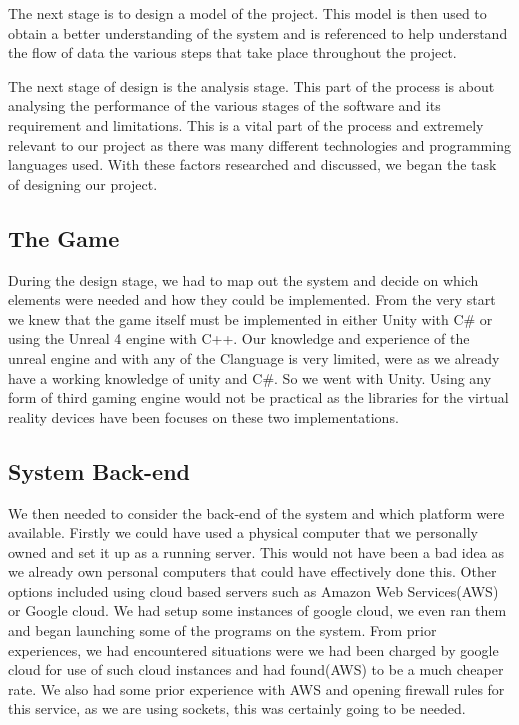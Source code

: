 The next stage is to design a model of the project. This model is then used to obtain a better understanding of the system and is referenced to help understand the flow of data the various steps that take place throughout the project. 

The next stage of design is the analysis stage. This part of the process is about analysing the performance of the various stages of the software and its requirement and limitations. This is a vital part of the process and extremely relevant to our project as there was many different technologies and programming languages used. With these factors researched and discussed, we began the task of designing our project.

\subsection {The Game}
During the design stage, we had to map out the system and decide on which elements were needed and how they could be implemented. From the very start we knew that the game itself must be implemented in either Unity with C\# or using the Unreal 4 engine with C++. Our knowledge and experience of the unreal engine and with any of the C\p\p language is very limited, were as we already have a working knowledge of unity and C\#. So we went with Unity. Using any form of third gaming engine would not be practical as the libraries for the virtual reality devices have been focuses on these two implementations.\newline

\subsection {System Back-end}
We then needed to consider the back-end of the system and which platform were available. Firstly we could have used a physical computer that we personally owned and set it up as a running server. This would not have been a bad idea as we already own personal computers that could have effectively done this. Other options included using cloud based servers such as Amazon Web Services(AWS) or Google cloud. We had setup some instances of google cloud, we even ran them and began launching some of the programs on the system. From prior experiences, we had encountered situations were we had been charged by google cloud for use of such cloud instances and had found(AWS) to be a much cheaper rate. We also had some prior experience with AWS and opening firewall rules for this service, as we are using sockets, this was certainly going to be needed.\newline

